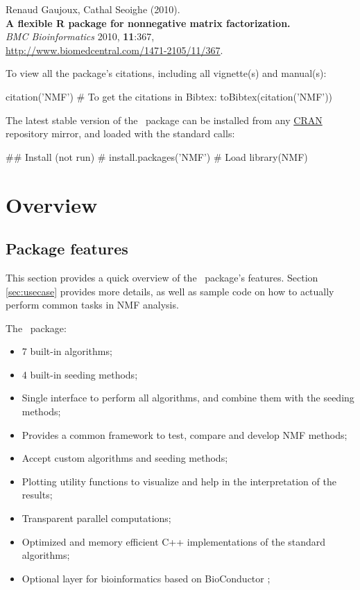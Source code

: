 \documentclass[a4paper]{article}
\newcommand{\nmfpack}{\code{NMF}\ }
\begin{document}
\medskip
\noindent Renaud Gaujoux, Cathal Seoighe (2010).\\
\textbf{A flexible R package for nonnegative matrix factorization.}\\
\emph{BMC Bioinformatics} 2010, \textbf{11}:367,\\
\url{http://www.biomedcentral.com/1471-2105/11/367}.

\medskip
To view all the package's citations, including all vignette(s) and manual(s):

\begin{Schunk}
\begin{Sinput}
 citation('NMF')
 # To get the citations in Bibtex:
 toBibtex(citation('NMF'))
\end{Sinput}
\end{Schunk}

The latest stable version of the \nmfpack package can be installed from any
\href{http://cran.r-project.org}{CRAN} repository mirror, and loaded with the 
standard calls:
\begin{Schunk}
\begin{Sinput}
 ## Install (not run)
 # install.packages('NMF')
 # Load
 library(NMF)
\end{Sinput}
\end{Schunk}

\pagebreak
\tableofcontents
\pagebreak

\section{Overview}

\subsection{Package features}

This section provides a quick overview of the \nmfpack package's features.
Section \ref{sec:usecase} provides more details, as well as sample code on how to actually 
perform common tasks in NMF analysis.


The \nmfpack package:
\begin{itemize}
\item 7 built-in algorithms;
\item 4 built-in seeding methods;
\item Single interface to perform all algorithms, and combine them with the seeding methods;
\item Provides a common framework to test, compare and develop NMF methods;
\item Accept custom algorithms and seeding methods;
\item Plotting utility functions to visualize and help in the interpretation of 
the results;
\item Transparent parallel computations;
\item Optimized and memory efficient C++ implementations of the standard algorithms;
\item Optional layer for bioinformatics based on BioConductor \cite{Gentleman2004};
\end{itemize}
\end{document}
